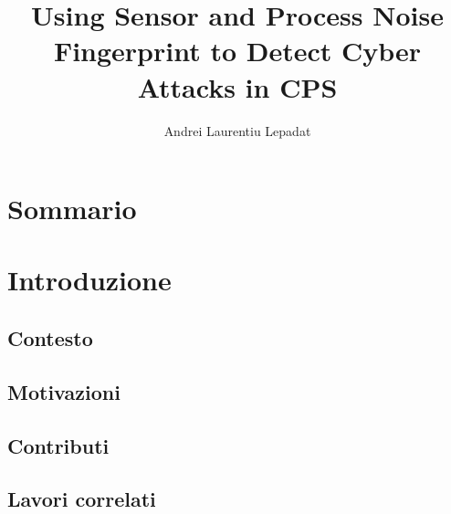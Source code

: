\documentclass[Lau,binding=0.6cm]{sapthesis}
\title{Using Sensor and Process Noise Fingerprint to Detect Cyber Attacks in CPS}
\author{Andrei Laurentiu Lepadat}
\begin{document}
\frontmatter

\maketitle

\dedication{Decidere se inserire. Ne vale la pena?}


\tableofcontents

\chapter{Sommario} 


\mainmatter

\chapter{Introduzione} 

\section{Contesto}

\section{Motivazioni}

\section{Contributi}

\section{Lavori correlati}
\end{document}
